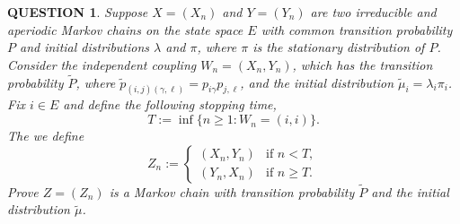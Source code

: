\documentclass[12pt]{article}
\renewcommand{\(}{\left(}%
\renewcommand{\)}{\right)}%
\renewcommand{\[}{\left[}%
\renewcommand{\]}{\right]}%
\newtheorem{question}{QUESTION}[section]}
\begin{document}
  \begin{question}
   Suppose $X=(X_n)$ and $Y=(Y_n)$ are two irreducible and aperiodic Markov chains on the state space $E$ with common transition probability $P$ and initial distributions $\lambda$ and $\pi$, where $\pi$ is the stationary distribution of $P$. Consider the independent coupling $W_n=(X_n,Y_n)$, which has the transition probability $\tilde{P}$, where $\tilde{ p}_{(i,j)(\gamma ,\ell )}=p_{i\gamma}p_{j,\ell}$, and the initial distribution $\tilde{\mu}_i=\lambda_i \pi_i$. Fix $i\in E$ and define the following stopping time,
   \begin{equation*}
    T:=\inf\{n\geq 1:W_n=(i,i) \}.
   \end{equation*}
   The we define
   \begin{equation*}
    Z_n:=\begin{cases}
     (X_n,Y_n)&\mbox{if }n< T,\\
     (Y_n,X_n)&\mbox{if }n\geq  T.
    \end{cases}
   \end{equation*}
   Prove $Z=(Z_n)$ is a Markov chain with transition probability $\tilde{P}$ and the initial distribution $\tilde{\mu}$.
  \end{question}
\end{document}
